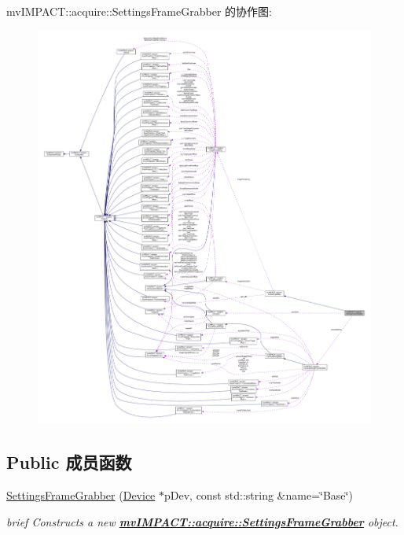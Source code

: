 mv\+I\+M\+P\+A\+C\+T\+:\+:acquire\+:\+:Settings\+Frame\+Grabber 的协作图\+:
\nopagebreak
\begin{figure}[H]
\begin{center}
\leavevmode
\includegraphics[width=350pt]{classmv_i_m_p_a_c_t_1_1acquire_1_1_settings_frame_grabber__coll__graph}
\end{center}
\end{figure}
\subsection*{Public 成员函数}
\begin{DoxyCompactItemize}
\item 
\hyperlink{classmv_i_m_p_a_c_t_1_1acquire_1_1_settings_frame_grabber_afb2b3581cb2a9d15aa953d02c97b64d0}{Settings\+Frame\+Grabber} (\hyperlink{classmv_i_m_p_a_c_t_1_1acquire_1_1_device}{Device} $\ast$p\+Dev, const std\+::string \&name=\char`\"{}Base\char`\"{})
\begin{DoxyCompactList}\small\item\em brief Constructs a new {\bfseries \hyperlink{classmv_i_m_p_a_c_t_1_1acquire_1_1_settings_frame_grabber}{mv\+I\+M\+P\+A\+C\+T\+::acquire\+::\+Settings\+Frame\+Grabber}} object. \end{DoxyCompactList}\end{DoxyCompactItemize}
